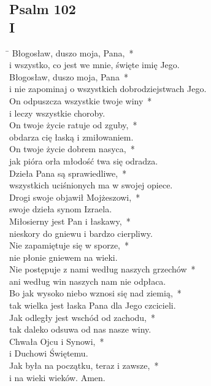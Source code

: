 \subsection*{Psalm 102\\I}
\begin{tabbing}
\hspace{4mm} \= \>\kill
Błogosław, duszo moja, Pana,~*\\
i wszystko, co jest we mnie, święte imię Jego.\\
\>Błogosław, duszo moja, Pana~*\\
\>i nie zapominaj o wszystkich dobrodziejstwach Jego.\\
On odpuszcza wszystkie twoje winy~*\\
i leczy wszystkie choroby.\\
\>On twoje życie ratuje od zguby,~*\\
\>obdarza cię łaską i zmiłowaniem.\\
On twoje życie dobrem nasyca,~*\\
jak pióra orła młodość twa się odradza.\\
\>Dzieła Pana są sprawiedliwe,~*\\
\>wszystkich uciśnionych ma w swojej opiece.\\
Drogi swoje objawił Mojżeszowi,~*\\
swoje dzieła synom Izraela.\\
\>Miłosierny jest Pan i łaskawy,~*\\
\>nieskory do gniewu i bardzo cierpliwy.\\
Nie zapamiętuje się w sporze,~*\\
nie płonie gniewem na wieki.\\
\>Nie postępuje z nami według naszych grzechów~*\\
\>ani według win naszych nam nie odpłaca.\\
Bo jak wysoko niebo wznosi się nad ziemią,~*\\
tak wielka jest łaska Pana dla Jego czcicieli.\\
\>Jak odległy jest wschód od zachodu,~*\\
\>tak daleko odsuwa od nas nasze winy.\\
Chwała Ojcu i Synowi,~*\\
i Duchowi Świętemu.\\
\>Jak była na początku, teraz i zawsze,~*\\
\>i na wieki wieków. Amen.
\end{tabbing}

